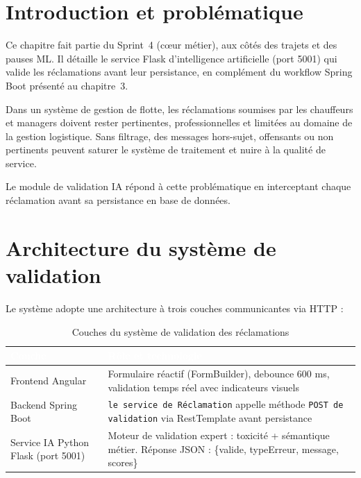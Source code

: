 \documentclass[12pt,a4paper]{report}
\newcommand{\thead}[1]{\cellcolor{tablehead}\textcolor{white}{\textbf{#1}}}
\begin{document}
\section{Introduction et problématique}
\label{sec:ch5-introduction}

Ce chapitre fait partie du Sprint~4 (cœur métier), aux côtés des trajets
et des pauses ML. Il détaille le service Flask d'intelligence artificielle
(port 5001) qui valide les réclamations avant leur persistance, en
complément du workflow Spring Boot présenté au chapitre~3.

Dans un système de gestion de flotte, les réclamations soumises par les
chauffeurs et managers doivent rester pertinentes, professionnelles et
limitées au domaine de la gestion logistique. Sans filtrage, des messages
hors-sujet, offensants ou non pertinents peuvent saturer le système de
traitement et nuire à la qualité de service.

Le module de validation IA répond à cette problématique en interceptant
chaque réclamation avant sa persistance en base de données.

\section{Architecture du système de validation}
\label{sec:ch5-archi}

Le système adopte une architecture à trois couches communicantes via HTTP :

\begin{table}[H]
  \centering
  \caption{Couches du système de validation des réclamations}
  \label{tab:archi_recla}
  \begin{tabularx}{\textwidth}{|l|Y|}
    \hline
    \thead{Couche} & \thead{Rôle et technologie} \\
    \hline
    Frontend Angular &
      Formulaire réactif (FormBuilder), debounce 600 ms,
      validation temps réel avec indicateurs visuels \\
    Backend Spring Boot &
      \texttt{le service de Réclamation} appelle méthode
      \texttt{POST de validation}
      via RestTemplate avant persistance \\
    Service IA Python Flask (port 5001) &
      Moteur de validation expert : toxicité + sémantique métier.
      Réponse JSON : \{valide, typeErreur, message, scores\} \\
    \hline
  \end{tabularx}
\end{table}
\end{document}
